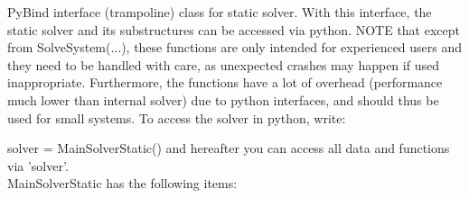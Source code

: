  \label{sec:MainSolverStatic}
PyBind interface (trampoline) class for static solver. With this interface, the static solver and its substructures can be accessed via python. NOTE that except from SolveSystem(...), these functions are only intended for experienced users and they need to be handled with care, as unexpected crashes may happen if used inappropriate. Furthermore, the functions have a lot of overhead (performance much lower than internal solver) due to python interfaces, and should thus be used for small systems. To access the solver in python, write: \bi
 \item[] solver = MainSolverStatic() 
\ei
 and hereafter you can access all data and functions via 'solver'.\\ 
%
MainSolverStatic has the following items:
